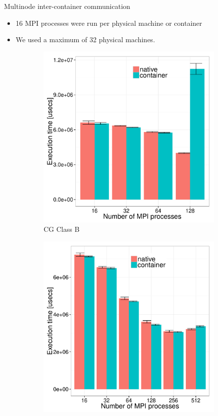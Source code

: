 \documentclass[presentation]{beamer}
\begin{document}
\begin{frame}[label=sec-3-7]{Multinode inter-container communication}
\begin{itemize}
\item 16 MPI processes were run per physical machine or container
\item We used a maximum of 32 physical machines.
\end{itemize}

\begin{figure}
  \centering
  \begin{subfigure}[b]{0.42\textwidth}
    \includegraphics[scale=0.25,angle=0]{figures/veth_overhead-tso-cgB.pdf}
    \caption{CG Class B}
  \end{subfigure}
  \begin{subfigure}[b]{0.42\textwidth}
    \includegraphics[scale=0.25,angle=0]{figures/veth_overhead-tso-ftB.pdf}

\end{subfigure}
\end{figure}
\end{frame}
\end{document}

